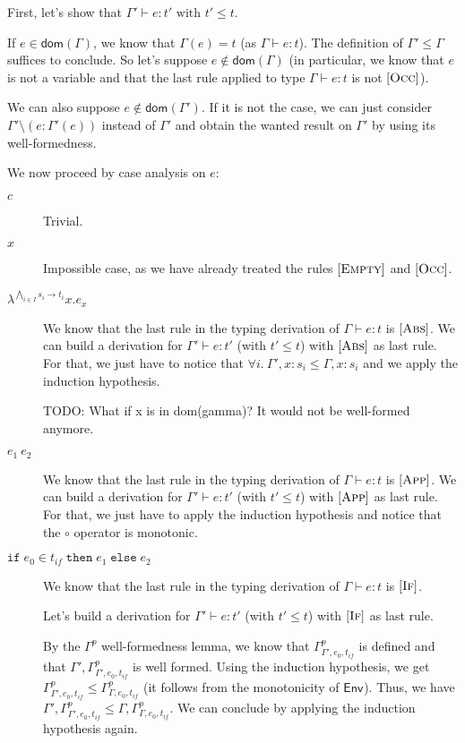 \documentclass[a4paper]{article}%
\newcommand{\dom}[1]{\textsf{dom}(#1)}
\newcommand{\ite}[4]{\ensuremath{\texttt{if}\;#1\in#2\;\texttt{then}\;#3\;\texttt{else}\;#4}}
\newcommand{\Gp}[2]{\textsf{Env}^{#1}_{#2}}
\theoremstyle{definition}
\newcommand {\Rule}[1] {[\textsc{#1}]}
\begin{document}
        First, let's show that $\Gamma' \vdash e:t' \text{ with } t' \leq t$.
    
        If $e\in\dom\Gamma$, we know that $\Gamma(e)=t$ (as $\Gamma \vdash e:t$). The definition of $\Gamma' \leq \Gamma$ suffices to conclude.
        So let's suppose $e\not\in\dom\Gamma$ (in particular, we know that $e$ is not a variable and that the last rule applied to type $\Gamma \vdash e:t$ is not $\Rule{Occ}$).
    
        We can also suppose $e\not\in\dom{\Gamma'}$. If it is not the case, we can just consider $\Gamma'\setminus(e:\Gamma'(e))$ instead of $\Gamma'$
        and obtain the wanted result on $\Gamma'$ by using its well-formedness.

        We now proceed by case analysis on $e$:
        \begin{description}
          \item[$c$] Trivial.
          \item[$x$] Impossible case, as we have already treated the rules $\Rule{Empty}$ and $\Rule{Occ}$.
          \item[$\lambda^{\bigwedge_{i\in I} s_i \rightarrow t_i}x.e_x$] We know that the last rule in the typing derivation of $\Gamma \vdash e:t$ is $\Rule {Abs}$.
          We can build a derivation for $\Gamma' \vdash e:t'$ (with $t'\leq t$) with $\Rule {Abs}$ as last rule.
          For that, we just have to notice that $\forall i.\ \Gamma',x:s_i \leq \Gamma,x:s_i$ and we apply the induction hypothesis.
          
          TODO: What if x is in dom(gamma)? It would not be well-formed anymore.

          \item[$e_1\ e_2$] We know that the last rule in the typing derivation of $\Gamma \vdash e:t$ is $\Rule {App}$.
          We can build a derivation for $\Gamma' \vdash e:t'$ (with $t'\leq t$) with $\Rule {App}$ as last rule.
          For that, we just have to apply the induction hypothesis and notice that the $\circ$ operator is monotonic.
          \item[$\ite {e_0} {t_{if}} {e_1} {e_2}$]
          We know that the last rule in the typing derivation of $\Gamma \vdash e:t$ is $\Rule {If}$.

          Let's build a derivation for $\Gamma' \vdash e:t'$ (with $t'\leq t$) with $\Rule {If}$ as last rule.

          By the $\Gamma^p$ well-formedness lemma, we know that $\Gamma^p_{\Gamma',e_0,t_{if}}$ is defined and that $\Gamma',\Gamma^p_{\Gamma',e_0,t_{if}}$ is well formed.
          Using the induction hypothesis, we get $\Gamma^p_{\Gamma',e_0,t_{if}} \leq \Gamma^p_{\Gamma,e_0,t_{if}}$ (it follows from the monotonicity of $\Gp {} {}$).
          Thus, we have $\Gamma',\Gamma^p_{\Gamma',e_0,t_{if}} \leq \Gamma,\Gamma^p_{\Gamma,e_0,t_{if}}$.
          We can conclude by applying the induction hypothesis again.\\
        \end{description}
    
\end{document}
